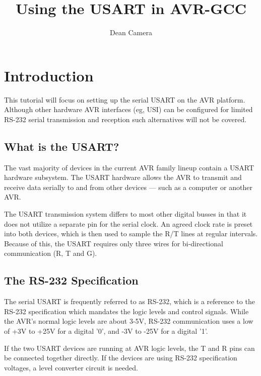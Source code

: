 \documentclass[a4paper,oneside,notitlepage]{book}
\begin{document}
\title{Using the USART in AVR-GCC}
\author{Dean Camera}

\maketitle

\tableofcontents
\cleardoublepage


\chapter{Introduction}

This tutorial will focus on setting up the serial USART on the AVR platform. Although other hardware AVR interfaces (eg, USI) can be configured for limited RS-232 serial transmission and reception such alternatives will not be covered.

\section{What is the USART?}

The vast majority of devices in the current AVR family lineup contain a USART hardware subsystem. The USART hardware allows the AVR to transmit and receive data serially to and from other devices --- such as a computer or another AVR.

The USART transmission system differs to most other digital busses in that it does not utilize a separate pin for the serial clock. An agreed clock rate is preset into both devices, which is then used to sample the R/T lines at regular intervals. Because of this, the USART requires only three wires for bi-directional communication (R, T and G).

\section{The RS-232 Specification}

The serial USART is frequently referred to as RS-232, which is a reference to the RS-232 specification which mandates the logic levels and control signals. While the AVR's normal logic levels are about 3-5V, RS-232 communication uses a low of +3V to +25V for a digital '0', and -3V to -25V for a digital '1'.

If the two USART devices are running at AVR logic levels, the T and R pins can be connected together directly. If the devices are using RS-232 specification voltages, a level converter circuit is needed.
\end{document}
